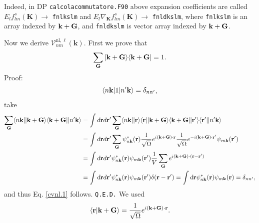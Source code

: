 \documentclass[letterpaper,aps]{revtex4}
\begin{document}
Indeed, in DP \verb=calcolacommutatore.F90= above expansion
coefficients are called\\
 $E_lf_{lm}^s (\mathbf{K})\to$ \verb=fnlkslm= and 
$E_l\nabla_\mathbf{K} f_{lm}^s(\mathbf{K})\to$ \verb=fnldkslm=, where 
 \verb=fnlkslm= is an array indexed by $\mathbf{k}+\mathbf{G}$, and 
 \verb=fnldkslm= is vector  array indexed by $\mathbf{k}+\mathbf{G}$.

Now we derive $\boldsymbol{\mathcal{V}}^{\mathrm{nl},\ell}_{nm}(\mathbf{k})$. First we prove that
\begin{eqnarray}\label{cvnl.1}
\sum_{\mathbf{G}}
| \mathbf{k}+\mathbf{G} \rangle\langle \mathbf{k}+\mathbf{G} |
=1
.
\end{eqnarray}
\noindent Proof:
\begin{align}\label{cvnl.2}
\langle n\mathbf{k} |1| n'\mathbf{k} \rangle=\delta_{nn'}
,
\end{align}
take
\begin{align}\label{cvnl.3}
\sum_{\mathbf{G}} \langle n\mathbf{k} || \mathbf{k}+\mathbf{G} \rangle\langle \mathbf{k}+\mathbf{G} || n'\mathbf{k} \rangle
&=
\int d\mathbf{r} d\mathbf{r}' 
\sum_{\mathbf{G}} \langle n\mathbf{k} |
| \mathbf{r} \rangle\langle \mathbf{r} |
| \mathbf{k}+\mathbf{G} \rangle\langle \mathbf{k}+\mathbf{G} |
| \mathbf{r}' \rangle\langle \mathbf{r}' |
| n'\mathbf{k} \rangle
\nonumber\\
&=
\int d\mathbf{r} d\mathbf{r}' 
\sum_{\mathbf{G}} 
\psi^*_{n\mathbf{k}}(\mathbf{r}) 
\frac{1}{\sqrt{\Omega}}e^{i(\mathbf{k}+\mathbf{G})\cdot\mathbf{r}}
\frac{1}{\sqrt{\Omega}}e^{-i(\mathbf{k}+\mathbf{G})\cdot\mathbf{r}'}
\psi_{m\mathbf{k}}(\mathbf{r}') 
\nonumber\\
&=
\int d\mathbf{r} d\mathbf{r}' 
\psi^*_{n\mathbf{k}}(\mathbf{r}) 
\psi_{m\mathbf{k}}(\mathbf{r}') 
\frac{1}{V}
\sum_{\mathbf{G}} 
e^{i(\mathbf{k}+\mathbf{G})\cdot(\mathbf{r}-\mathbf{r}')}
\nonumber\\
&=
\int d\mathbf{r} d\mathbf{r}' 
\psi^*_{n\mathbf{k}}(\mathbf{r}) 
\psi_{m\mathbf{k}}(\mathbf{r}') 
\delta(\mathbf{r}-\mathbf{r}')
=
\int d\mathbf{r}
\psi^*_{n\mathbf{k}}(\mathbf{r}) 
\psi_{m\mathbf{k}}(\mathbf{r})=\delta_{nn'} ,
\end{align}
and thus Eq. \eqref{cvnl.1} follows. \verb=Q.E.D.=
We used
\begin{align}\label{vnl.4}
\langle {\mathbf{r}} | {\mathbf{k}+\mathbf{G}} \rangle=\frac{1}{\sqrt{\Omega}}e^{i(\mathbf{k}+\mathbf{G})\cdot\mathbf{r}}
.
\end{align}
\end{document}
